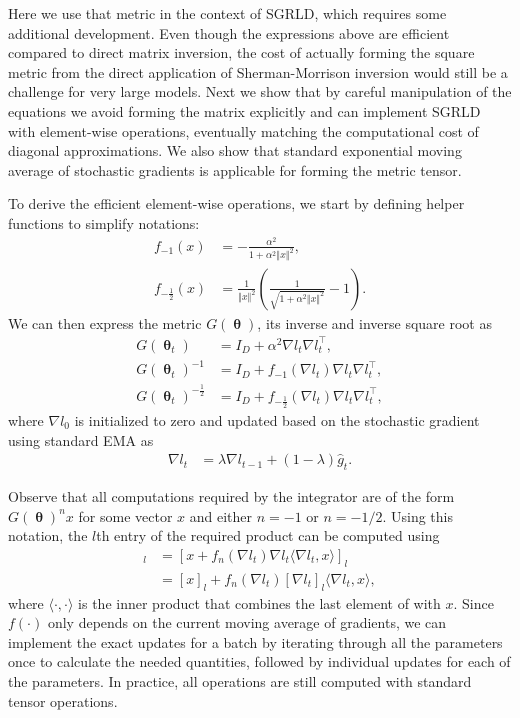 \documentclass[10pt]{article} %
\DeclareMathOperator{\btheta}{\boldsymbol{\theta}}
\theoremstyle{plain}
\theoremstyle{definition}
\theoremstyle{remark}
\begin{document}
Here we use that metric in the context of SGRLD, which requires some additional development. Even though the expressions above are efficient compared to direct matrix inversion, the cost of actually forming the square metric from the direct application of Sherman-Morrison inversion would still be a challenge for very large models. Next we show that by careful manipulation of the equations we avoid forming the matrix explicitly and can implement SGRLD with element-wise operations, eventually matching the computational cost of diagonal approximations. We also show that
standard exponential moving average of stochastic gradients is applicable for forming the metric tensor.

To derive the efficient element-wise operations, we start by defining helper functions to simplify notations:
\begin{align*}
f_{-1}(x) &= -\frac{\alpha^{2}}{1+\alpha^{2}\Vert x\Vert^{2}},\\
f_{-\frac{1}{2}}(x) &=  \frac{1}{\Vert x\Vert^{2}}\left(\frac{1}{\sqrt{1+\alpha^{2}\Vert x\Vert^{2}}}-1\right).
\end{align*}
We can then express the metric $G(\btheta)$, its inverse and inverse square root as
\begin{align}
\label{eq:monge_update}
G(\btheta_t) &= I_{D}+\alpha^{2} \nabla l_{t} \nabla l_{t}^{\top} \nonumber,\\ 
G(\btheta_t)^{-1} &= I_{D} +f_{-1}(\nabla l_t) \nabla l_{t}\nabla l_{t}^{\top},\\
G(\btheta_t)^{-\frac{1}{2}} &= I_{D} + f_{-\frac{1}{2}}(\nabla l_t)\nabla l_{t} \nabla l_{t}^{\top}\nonumber,
\end{align}
where $\nabla l_0$ is initialized to zero and updated based on the stochastic gradient using standard EMA as
\begin{align*}
\nabla l_{t} &= \lambda \nabla l_{t-1} + (1-\lambda) \hat{g}_t.
\end{align*}

Observe that all computations required by the integrator are of the form $G(\btheta)^n x$ for some vector $x$ and either $n=-1$ or $n=-{1/2}$. Using this notation, the $l$th entry of the required product
can be computed using
\begin{align*}
[G(\btheta_t)^{n}x]_{l} &= [x + f_{n}(\nabla l_t)\nabla l_t\langle\nabla l_t , x\rangle] _{l}\\
&= [x]_{l} + f_{n}(\nabla l_t)[\nabla l_t]_{l} \langle\nabla l_t , x\rangle,
\end{align*}
where $\langle \cdot, \cdot \rangle$ is the inner product that combines the last element of  with $x$. Since $f(\cdot)$ only depends on the current moving average of gradients, we can implement the exact updates for a batch by iterating through all the parameters once to calculate the needed quantities, followed by individual updates for each of the parameters. In practice, all operations are still computed with standard tensor operations.
\end{document}
